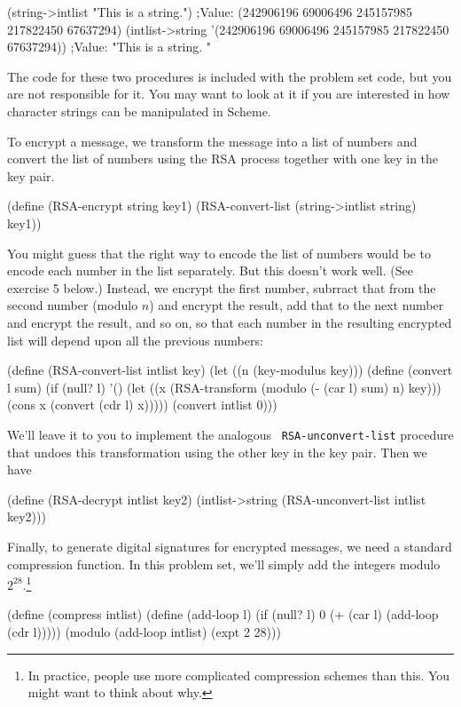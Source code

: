 \beginlisp
(string->intlist "This is a string.")
;Value: (242906196 69006496 245157985 217822450 67637294)
\null
(intlist->string '(242906196 69006496 245157985 217822450 67637294))
;Value: "This is a string.   "
\endlisp

\noindent
The code for these two procedures is included with the problem set
code, but you are not responsible for it.  You may want to look at it
if you are interested in how character strings can be manipulated in
Scheme.

To encrypt a message, we transform the message into a list of numbers
and convert the list of numbers using the RSA process together with
one key in the key pair.

\beginlisp
(define (RSA-encrypt string key1)
  (RSA-convert-list (string->intlist string) key1))
\endlisp

\noindent

You might guess that the right way to encode the list of numbers would
be to encode each number in the list separately.  But this doesn't
work well.  (See exercise 5 below.)  Instead, we encrypt the
first number, subrract that from the second number (modulo $n$) and
encrypt the result, add that to the next number and encrypt the
result, and so on, so that each number in the resulting encrypted list
will depend upon all the previous numbers:

\beginlisp
(define (RSA-convert-list intlist key)
  (let ((n (key-modulus key)))
    (define (convert l sum)
      (if (null? l)
          '()
          (let ((x (RSA-transform (modulo (- (car l) sum) n)
                                  key)))
            (cons x (convert (cdr l) x)))))
    (convert intlist 0)))
\endlisp

We'll leave it to you to implement the analogous {\tt
RSA-unconvert-list} procedure that undoes this transformation using
the other key in the key pair.  Then
we have

\beginlisp
(define (RSA-decrypt intlist key2)
  (intlist->string (RSA-unconvert-list intlist key2)))
\endlisp


Finally, to generate digital signatures for encrypted messages, we
need a standard compression function.  In this problem set, we'll
simply add the integers modulo $2^{28}$.\footnote{In practice, people
use more complicated compression schemes than this.  You might want to
think about why.}

\beginlisp
(define (compress intlist)
  (define (add-loop l)
    (if (null? l)
        0
        (+ (car l) (add-loop (cdr l)))))
  (modulo (add-loop intlist) (expt 2 28)))
\endlisp

